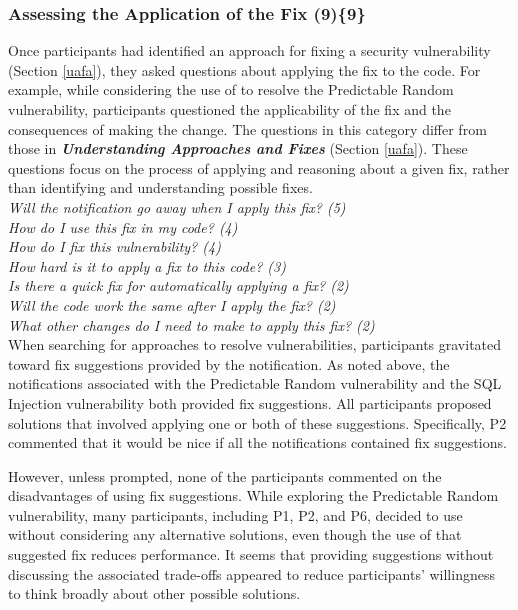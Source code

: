 \documentclass[10pt,journal,compsoc]{IEEEtran}
\begin{document}

\subsubsection{Assessing the Application of the Fix (9)\{9\}}\label{aaf}

Once participants had identified an approach for fixing a security vulnerability (Section \ref{uafa}), they asked questions about applying the fix to the code.
For example, while considering the use of  to resolve the Predictable Random vulnerability, participants questioned the applicability of the fix and the consequences of making the change. 
The questions in this category differ from those in \emph{\textbf{Understanding Approaches and Fixes }} (Section \ref{uafa}). 
These questions focus on the process of applying  and reasoning about a given fix, rather than identifying and understanding possible fixes.
\\

\noindent\emph{Will the notification go away when I apply this fix? (5)} \\
\emph{How do I use this fix in my code? (4)} \\
\emph{How do I fix this vulnerability? (4)} \\
\emph{How hard is it to apply a fix to this code? (3)} \\
\emph{Is there a quick fix for automatically applying a fix? (2)} \\
\emph{Will the code work the same after I apply the fix? (2)} \\
\emph{What other changes do I need to make to apply this fix? (2)} 
\\

 
When searching for approaches to resolve vulnerabilities, participants gravitated toward fix suggestions provided by the notification.
As noted above, the notifications associated with the Predictable Random vulnerability and the SQL Injection vulnerability both provided fix suggestions.
All participants proposed solutions that involved applying one or both of these suggestions. 
Specifically, P2 commented that it would be nice if all the notifications contained fix suggestions.

However, unless prompted, none of the participants commented on the disadvantages of using fix suggestions.
While exploring the Predictable Random vulnerability, many participants, including P1, P2, and P6, decided to use  without considering any alternative solutions, even though the use of that suggested fix reduces performance.
It seems that providing suggestions without discussing the associated trade-offs appeared to reduce participants' willingness to think broadly about other possible solutions. 
\end{document}
